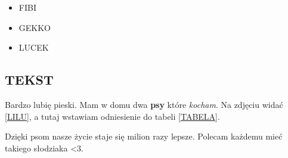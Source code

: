 \begin{itemize}
    \item FIBI
    \item GEKKO
    \item LUCEK
\end{itemize}

\subsection{TEKST}

Bardzo lubię pieski. Mam w domu dwa \textbf{psy} które \textit{kocham}. Na zdjęciu widać \ref{LILU}, a tutaj wstawiam odniesienie do tabeli \ref{TABELA}.

Dzięki psom nasze życie staje się milion razy lepsze. Polecam każdemu mieć takiego słodziaka <3. 

% 
